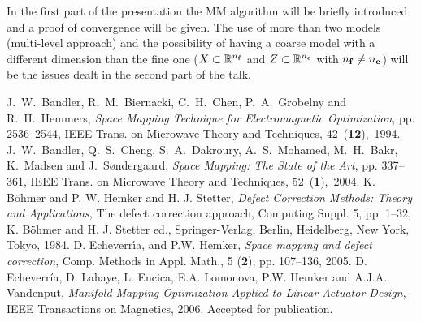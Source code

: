 \documentclass{report}
\begin{document}
In the first part of the presentation the MM algorithm will be
briefly introduced and a proof of convergence will be given. The use
of more than two models (multi-level approach) and the possibility
of having a coarse model with a different dimension than the fine
one ($X \subset \mathbb{R}^{n_{\mathbf f}}$ and $Z \subset \mathbb{R}^{n_{\mathbf c}}$ with $n_{\mathbf f}
\neq n_{\mathbf c}$) will be the issues dealt in the second part of the
talk.

\begin{thebibliography}{1}
 J.~W.~Bandler, R.~M.~Biernacki,
C.~H.~Chen, P.~A.~Grobelny and R.~H.~Hemmers,
{\em Space Mapping Technique for Electromagnetic Optimization},
pp. 2536--2544, IEEE Trans. on Microwave Theory and Techniques,
\mbox{42 ({\bf 12}), 1994}.
 J.~W.~Bandler, Q.~S.~Cheng, S.~A.~Dakroury,
A.~S.~Mohamed, M.~H.~Bakr, K.~Madsen and J.~S{\o}ndergaard,
{\em Space Mapping: The State of the Art}, pp. 337--361, IEEE Trans. on Microwave
Theory and Techniques, \mbox{52 ({\bf 1}), 2004}.
 K. B{\"o}hmer and P. W. Hemker and H. J. Stetter, {\em
Defect Correction Methods: Theory and Applications}, The defect
correction approach, Computing Suppl. 5, pp. 1--32, K. B{\"o}hmer and H.
J. Stetter ed., Springer-Verlag, Berlin, Heidelberg, New York, Tokyo,
1984.
 D. Echeverr\'{\i}a, and P.W. Hemker, {\em Space mapping
and defect correction}, Comp. Methods in Appl. Math., 5 ({\bf 2}), pp.
107--136, 2005.
 D. Echeverr\'{i}a, D. Lahaye, L. Encica, E.A. Lomonova,
P.W. Hemker and A.J.A. Vandenput,
{\em Manifold-Mapping Optimization Applied to Linear Actuator Design},
IEEE Transactions on Magnetics, 2006. Accepted for publication.
\end{thebibliography}
\thispagestyle{empty}
\end{document}
